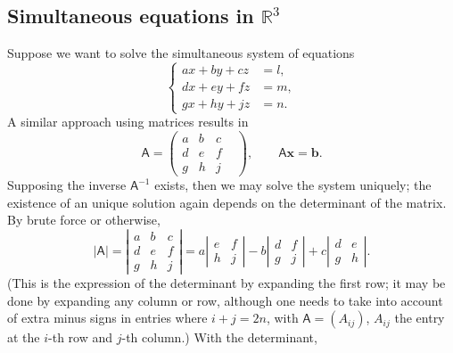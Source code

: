 \documentclass[10pt,notitlepage]{revtex4-1}
\newcommand{\xb}{\boldsymbol{x}}
\newcommand{\bb}{{\boldsymbol{b}}}
\begin{document}

\subsection{Simultaneous equations in $\mathbb{R}^3$}

Suppose we want to solve the simultaneous system of equations
\begin{equation}
	\begin{cases}ax+by+cz&=l,\\ dx+ey+fz&=m,\\ gx+hy+jz&=n.\end{cases}
\end{equation}
A similar approach using matrices results in
\begin{equation}
	\mathsf{A}=\begin{pmatrix}a & b & c\\ d & e & f &\\ g & h & j \end{pmatrix},
	\qquad \mathsf{A}\xb=\bb.
\end{equation}
Supposing the inverse $\mathsf{A}^{-1}$ exists, then we may solve the system
uniquely; the existence of an unique solution again depends on the determinant
of the matrix. By brute force or otherwise,
\begin{equation}
	|\mathsf{A}|=\left|\begin{matrix}a & b & c\\ d & e & f \\ g & h & j
	\end{matrix}\right|=
	a\left|\begin{matrix}e & f \\ h & j\end{matrix}\right|
	-b\left|\begin{matrix} d & f \\ g & j \end{matrix}\right|
	+c\left|\begin{matrix} d & e \\ g & h \end{matrix}\right|.
\end{equation}
(This is the expression of the determinant by expanding the first row; it may be
done by expanding any column or row, although one needs to take into account of
extra minus signs in entries where $i+j=2n$, with $\mathsf{A}=(A_{ij})$,
$A_{ij}$ the entry at the $i$-th row and $j$-th column.) With the determinant,
\end{document}
